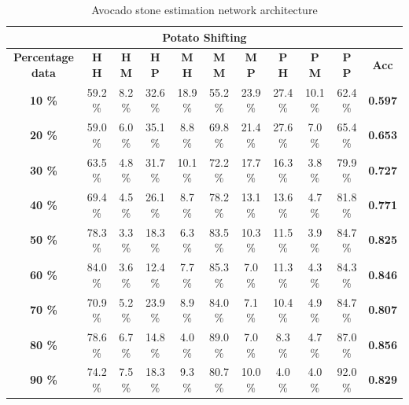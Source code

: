 \documentclass[11pt]{article}
\begin{document}
  \begin{table}[h!]
  \centering
  \begin{adjustbox}{max width=\textwidth}
  \begin{tabular}{*{11}{c}}%
  \hline
  \multicolumn{11}{c}{\textbf{Potato Shifting}}
  \\
 \hline
 \textbf{Percentage data} & \textbf{H H} & \textbf{H M} & \textbf{H P} & \textbf{M H} & \textbf{M M} & \textbf{M P} & \textbf{P H} & \textbf{P M} & \textbf{P P} & \textbf{Acc}\\
 \hline
 \hline
 \textbf{10 \%}  & 59.2 \% & 8.2 \% & 32.6 \% & 18.9 \% & 55.2 \% & 23.9 \% & 27.4 \% & 10.1 \% & 62.4 \% & \textbf{0.597} \\
 \hline
 \textbf{20 \%} & 59.0 \% & 6.0 \% & 35.1 \% & 8.8 \% & 69.8 \% & 21.4 \% & 27.6 \% & 7.0 \% & 65.4 \% & \textbf{0.653} \\
 \hline
 \textbf{30 \%} & 63.5 \% & 4.8 \% & 31.7 \% & 10.1 \% & 72.2 \% & 17.7 \% & 16.3 \% & 3.8 \% & 79.9 \% & \textbf{0.727} \\
 \hline
 \textbf{40 \%} & 69.4 \% & 4.5 \% & 26.1 \% & 8.7 \% & 78.2 \% & 13.1 \% & 13.6 \% & 4.7 \%  & 81.8 \% & \textbf{0.771} \\
 \hline
 \textbf{50 \%} & 78.3 \% & 3.3 \% & 18.3 \% & 6.3 \% & 83.5 \% & 10.3 \% & 11.5 \% & 3.9 \% & 84.7 \% & \textbf{0.825} \\
 \hline
 \textbf{60 \%} & 84.0 \% & 3.6 \% & 12.4 \% & 7.7 \% & 85.3 \% & 7.0 \% & 11.3 \% & 4.3 \% & 84.3 \% & \textbf{0.846} \\
 \hline
 \textbf{70 \%} & 70.9 \% & 5.2 \% & 23.9 \% & 8.9 \% & 84.0 \% & 7.1 \% & 10.4 \% & 4.9 \% & 84.7 \% & \textbf{0.807} \\
 \hline
\textbf{80 \%} & 78.6 \% & 6.7 \% & 14.8 \%  & 4.0 \% & 89.0 \% & 7.0 \% & 8.3 \% & 4.7 \% & 87.0 \% & \textbf{0.856} \\
 \hline
 \textbf{90 \%} & 74.2 \% & 7.5 \% & 18.3 \% & 9.3 \% & 80.7 \% & 10.0 \% & 4.0 \% & 4.0 \% & 92.0 \% & \textbf{0.829} \\
 \hline
\end{tabular}
\end{adjustbox}
  \caption{Avocado stone estimation network architecture}
  \label{tab:experiments_avo_cnn}
\end{table}
\end{document}
